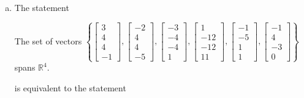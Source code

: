 \begin{exerciseAnswer}
\begin{enumerate}[(a)]
\item The statement 
\begin{center}\begin{minipage}{0.8\textwidth}
 The set of vectors \( \left\{ \left[\begin{array}{c}
3 \\
4 \\
4 \\
-1
\end{array}\right] , \left[\begin{array}{c}
-2 \\
4 \\
4 \\
-5
\end{array}\right] , \left[\begin{array}{c}
-3 \\
-4 \\
-4 \\
1
\end{array}\right] , \left[\begin{array}{c}
1 \\
-12 \\
-12 \\
11
\end{array}\right] , \left[\begin{array}{c}
-1 \\
-5 \\
1 \\
1
\end{array}\right] , \left[\begin{array}{c}
-1 \\
4 \\
-3 \\
0
\end{array}\right] \right\} \) spans \(\mathbb{R}^4\). 
\end{minipage}\end{center}
     is equivalent to the statement 
\begin{center}\begin{minipage}{0.8\textwidth}
 The vector equation \( x_{1} \left[\begin{array}{c}
3 \\
4 \\
4 \\
-1
\end{array}\right] + x_{2} \left[\begin{array}{c}
-2 \\
4 \\

\end{array}
\end{minipage}
\end{center}
\end{enumerate}
\end{exerciseAnswer}
